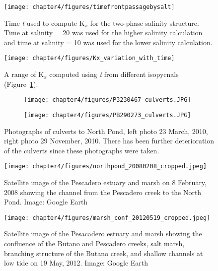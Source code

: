 \begin{figure}
\centering
	\texttt{[image: chapter4/figures/timefrontpassagebysalt]}
	\caption{Time \emph{t} used to compute K$_x$ for the two-phase salinity structure. Time at salinity = 20 was used for the higher salinity calculation and time at salinity = 10 was used for the lower salinity calculation.}  \label{fig:tvsS}
\end{figure}



\begin{figure}
\centering
	\texttt{[image: chapter4/figures/Kx\_variation\_with\_time]}
	\caption{A range of K$_x$ computed using \emph{t} from different isopycnals (Figure~\ref{fig:tvsS}).}  \label{fig:Kxvst}
\end{figure}



\begin{figure}
\centering
\begin{subfigure}{.48\textwidth}
	\texttt{[image: chapter4/figures/P3230467\_culverts.JPG]}
\end{subfigure}
\begin{subfigure}{.48\textwidth}
	\texttt{[image: chapter4/figures/PB290273\_culverts.JPG]}
\end{subfigure}
\caption{Photographs of culverts to North Pond, left photo 23 March, 2010, right photo 29 November, 2010. There has been further deterioration of the culverts since these photographs were taken.} \label{fig:photoCulverts}
\end{figure}



\begin{figure}
\centering
	\texttt{[image: chapter4/figures/northpond\_20080208\_cropped.jpeg]}
	\caption{Satellite image of the Pescadero estuary and marsh on 8 February, 2008 showing the channel from the Pescadero creek to the North Pond. Image: Google Earth} \label{fig:geNP}
\end{figure}


\begin{figure}
\centering
	\texttt{[image: chapter4/figures/marsh\_conf\_20120519\_cropped.jpeg]}
	\caption{Satellite image of the Pesacadero estuary and marsh showing the confluence of the Butano and Pescadero creeks, salt marsh, branching structure of the Butano creek, and shallow channels at low tide on 19 May, 2012. Image: Google Earth} \label{fig:geMarsh}
\end{figure}

